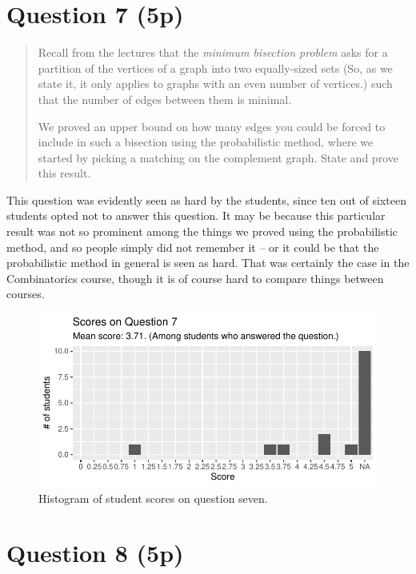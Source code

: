 \documentclass[nobib]{tufte-handout}
\begin{document}
\section{Question 7 (5p)} %

\begin{quotation}
  Recall from the lectures that the \emph{minimum bisection problem} asks for a partition of the vertices of a graph into two equally-sized sets (So, as we state it, it only applies to graphs with an even number of vertices.) such that the number of edges between them is minimal.

  We proved an upper bound on how many edges you could be forced to include in such a bisection using the probabilistic method, where we started by picking a matching on the complement graph. State and prove this result.
\end{quotation}

This question was evidently seen as hard by the students, since ten out of sixteen students opted not to answer this question. It may be because this particular result was not so prominent among the things we proved using the probabilistic method, and so people simply did not remember it -- or it could be that the probabilistic method in general is seen as hard. That was certainly the case in the Combinatorics course, though it is of course hard to compare things between courses.

\begin{figure}[p]
  \centering
  \includegraphics[width = \textwidth]{Q7.pdf}
  \caption[Score histogram for Q7]{Histogram of student scores on question seven.}
  \label{fig:Q7}
\end{figure}

\section{Question 8 (5p)} %
\end{document}
